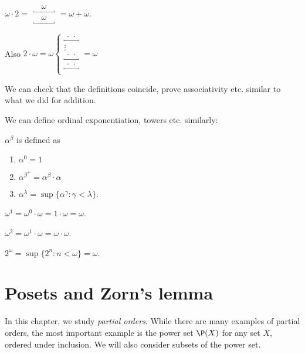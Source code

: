 \documentclass[a4paper]{article}
\begin{document}
\begin{eg}
  $\displaystyle\omega\cdot 2 =
  \begin{array}{c}
    \underbracket{\quad\omega\quad}\\
    \underbracket{\quad\omega\quad}
  \end{array} = \omega + \omega$.

  Also $2\cdot \omega = \omega\left\{
  \begin{array}{c}
    \underbracket{\,\cdot\,\cdot\,} \\
    \vdots \\
    \underbracket{\,\cdot\,\cdot\,} \\
    \underbracket{\,\cdot\,\cdot\,} \\
  \end{array}\right. = \omega$
\end{eg}
We can check that the definitions coincide, prove associativity etc. similar to what we did for addition.

We can define ordinal exponentiation, towers etc. similarly:
\begin{defi}
  $\alpha^\beta$ is defined as
  \begin{enumerate}
    \item $\alpha^0 = 1$
    \item $\alpha^{\beta^+} = \alpha^\beta \cdot \alpha$
    \item $\alpha^{\lambda} = \sup \{\alpha^\gamma: \gamma< \lambda\}$.
  \end{enumerate}
\end{defi}

\begin{eg}
  $\omega^1 = \omega^0\cdot \omega = 1\cdot \omega = \omega$.

  $\omega^2 = \omega^1\cdot \omega = \omega\cdot \omega$.

  $2^{\omega} = \sup \{2^n: n < \omega\} = \omega$.
\end{eg}

\section{Posets and Zorn's lemma}
\label{sec:poset}
In this chapter, we study \emph{partial orders}. While there are many examples of partial orders, the most important example is the power set $\P(X)$ for any set $X$, ordered under inclusion. We will also consider subsets of the power set.
\end{document}
